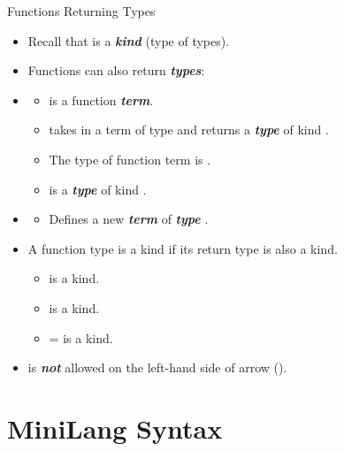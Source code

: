 \documentclass{beamer}
\renewcommand{\emph}[1]{\textbf{\textit{#1}}}
\begin{document}
\begin{frame}{Functions Returning Types}
\begin{itemize}
\item Recall that  is a \emph{kind} (type of types).

\item Functions can also return \emph{types}:

\item {}

  \begin{itemize}
  \item {} is a function \emph{term}.
  \item {} takes in a term of type 
  and returns a \emph{type} of kind .
  \item The type of function term  is
  .
  \item {} is a \emph{type} of
  kind .
  \end{itemize}

\pause
\item {}
  \begin{itemize}
  \item Defines a new \emph{term}  of
  \emph{type} .
  \end{itemize}

\pause
\item A function type is a kind if its return type
is also a kind.
  \begin{itemize}
  \item {} is a kind.
  \item {} is a kind.
  \item {} =
         is a kind.
  \end{itemize}
\item {} is \emph{not} allowed on the left-hand side of arrow (\code{->}).
\end{itemize}
\end{frame}

\section{MiniLang Syntax}
\end{document}
